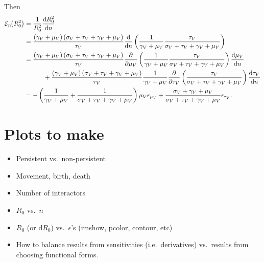 \documentclass{article}
\newcommand{\md}{\mathrm{d}}
\newcommand{\elasticity}[2]{\mathcal{E}_{#2}\negthickspace\left({#1}\right)}
\begin{document}
Then
\begin{equation}
  \begin{split}
    \elasticity{R_0^2}{n} &=
    \frac{1}{R_0^2} \frac{\md R_0^2}{\md n}
    \\
    &=
    \frac{\left(\gamma_V + \mu_V\right)
      \left(\sigma_V + \tau_V + \gamma_V + \mu_V\right)}
    {\tau_V}
    \frac{\md}{\md n}
    \left(
      \frac{1}{\gamma_V + \mu_V}
      \frac{\tau_V}{\sigma_V + \tau_V + \gamma_V + \mu_V}
    \right)
    \\
    &=
    \frac{\left(\gamma_V + \mu_V\right)
      \left(\sigma_V + \tau_V + \gamma_V + \mu_V\right)}
    {\tau_V}
    \frac{\partial}{\partial \mu_V}
    \left(
      \frac{1}{\gamma_V + \mu_V}
      \frac{\tau_V}{\sigma_V + \tau_V + \gamma_V + \mu_V}
    \right)
    \frac{\md \mu_V}{\md n}
    \\ & \quad\quad\quad {}
    + \frac{\left(\gamma_V + \mu_V\right)
      \left(\sigma_V + \tau_V + \gamma_V + \mu_V\right)}
    {\tau_V}
    \frac{1}{\gamma_V + \mu_V}
    \frac{\partial}{\partial \tau_V}
    \left(
      \frac{\tau_V}{\sigma_V + \tau_V + \gamma_V + \mu_V}
    \right)
    \frac{\md \tau_V}{\md n}
    \\
    &=
    - \left(
      \frac{1}{\gamma_V + \mu_V}
      +
      \frac{1}{\sigma_V + \tau_V + \gamma_V + \mu_V}
    \right)
    \mu_V \epsilon_{\mu_V}
    +
    \frac{\sigma_V + \gamma_V + \mu_V}
    {\sigma_V + \tau_V + \gamma_V + \mu_V}
    \epsilon_{\tau_V}.
  \end{split}
\end{equation}


\section{Plots to make}

\begin{itemize}
\item Persistent vs.~non-persistent
\item Movement, birth, death
\item Number of interactors
\end{itemize}

\begin{itemize}
\item $R_0$ vs.~$n$
\item $R_0$ (or $\md R_0$) vs.~$\epsilon$'s (imshow, pcolor, contour,
  etc)
\item How to balance results from sensitivities (i.e.~derivatives)
  vs.~results from choosing functional forms.
\end{itemize}
\end{document}
